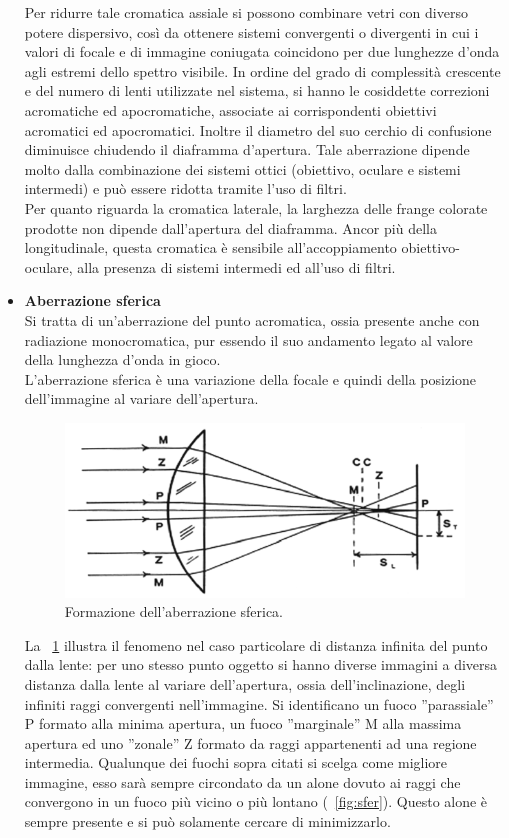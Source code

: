 \begin{itemize}
Per ridurre tale cromatica assiale si possono combinare vetri con diverso potere dispersivo, così da ottenere sistemi convergenti o divergenti in cui i valori di focale e di immagine coniugata coincidono per due lunghezze d'onda agli estremi dello spettro visibile. In ordine del grado di complessità crescente e del numero di lenti utilizzate nel sistema, si hanno le cosiddette correzioni acromatiche ed apocromatiche, associate ai corrispondenti obiettivi acromatici ed apocromatici. Inoltre il diametro del suo cerchio di confusione diminuisce chiudendo il diaframma d'apertura. Tale aberrazione dipende molto dalla combinazione dei sistemi ottici (obiettivo, oculare e sistemi intermedi) e può essere ridotta tramite l'uso di filtri. \\
Per quanto riguarda la cromatica laterale, la larghezza delle frange colorate prodotte non dipende dall'apertura del diaframma. Ancor più della longitudinale, questa cromatica è sensibile all'accoppiamento obiettivo-oculare, alla presenza di sistemi intermedi ed all'uso di filtri.\\

\item \textbf{Aberrazione sferica}\\
Si tratta di un'aberrazione del punto acromatica, ossia presente anche con radiazione monocromatica, pur essendo il suo andamento legato al valore della lunghezza d'onda in gioco.\\
L'aberrazione sferica è una variazione della focale e quindi della posizione dell'immagine al variare dell'apertura. 

\begin{figure}[!ht]
 \centering
 \includegraphics[scale=.35]{img/CAP2as.png}
 \caption{\small{Formazione dell'aberrazione sferica.}}
 \label{fig:as}
\end{figure}

La \figurename~\ref{fig:as} illustra il fenomeno nel caso particolare di distanza infinita del punto dalla lente: per uno stesso punto oggetto si hanno diverse immagini a diversa distanza dalla lente al variare dell'apertura, ossia dell'inclinazione, degli infiniti raggi convergenti nell'immagine. Si identificano un fuoco ''parassiale'' P formato alla minima apertura, un fuoco ''marginale'' M alla massima apertura ed uno ''zonale'' Z formato da raggi appartenenti ad una regione intermedia.
Qualunque dei fuochi sopra citati si scelga come migliore immagine, esso sarà sempre circondato da un alone dovuto ai raggi che convergono in un fuoco più vicino o più lontano (\figurename~\ref{fig:sfer}). Questo alone è sempre presente e si può solamente cercare di minimizzarlo. 


\end{itemize}

